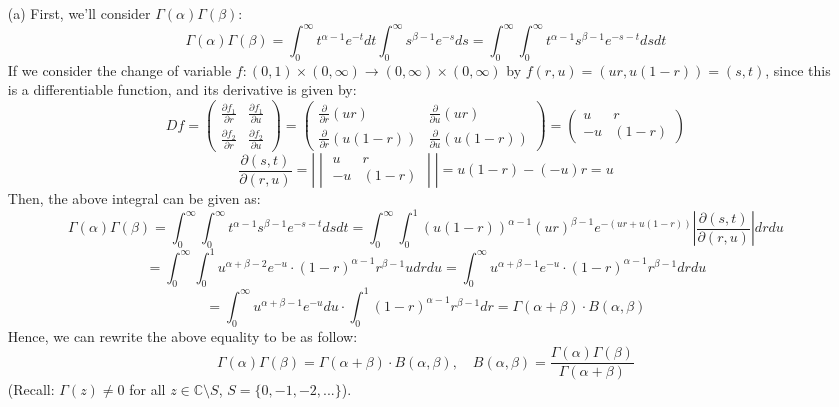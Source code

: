 \documentclass{article}
\begin{document}
\begin{itemize}
    \item[(a)] First, we'll consider $\Gamma(\alpha)\Gamma(\beta)$:
    $$\Gamma(\alpha)\Gamma(\beta)=\int_{0}^{\infty}t^{\alpha-1}e^{-t}dt\int_{0}^{\infty}s^{\beta-1}e^{-s}ds=\int_{0}^{\infty}\int_{0}^{\infty}t^{\alpha-1}s^{\beta-1}e^{-s-t}dsdt$$
    If we consider the change of variable $f:(0,1)\times (0,\infty)\rightarrow (0,\infty)\times (0,\infty)$ by $f(r,u)=(ur,u(1-r))=(s,t)$, since this is a differentiable function, and its derivative is given by:
    $$Df = \begin{pmatrix}
        \frac{\partial f_1}{\partial r}&\frac{\partial f_1}{\partial u}\\
        \frac{\partial f_2}{\partial r}&\frac{\partial f_2}{\partial u}
    \end{pmatrix}=\begin{pmatrix}
        \frac{\partial}{\partial r}(ur)&\frac{\partial}{\partial u}(ur)\\
        \frac{\partial}{\partial r}(u(1-r))&\frac{\partial}{\partial u}(u(1-r))
    \end{pmatrix}=\begin{pmatrix}
        u&r\\
        -u&(1-r) 
    \end{pmatrix}$$
    $$\frac{\partial (s,t)}{\partial (r,u)}=|\begin{vmatrix}
        u&r\\-u&(1-r)
    \end{vmatrix}|=u(1-r)-(-u)r=u$$
    Then, the above integral can be given as:
    $$\Gamma(\alpha)\Gamma(\beta)=\int_{0}^{\infty}\int_{0}^{\infty}t^{\alpha-1}s^{\beta-1}e^{-s-t}dsdt = \int_{0}^{\infty}\int_{0}^{1}(u(1-r))^{\alpha-1}(ur)^{\beta-1}e^{-(ur+u(1-r))}\left|\frac{\partial (s,t)}{\partial (r,u)}\right|drdu$$
    $$=\int_{0}^{\infty}\int_{0}^{1}u^{\alpha+\beta-2}e^{-u}\cdot (1-r)^{\alpha-1}r^{\beta-1}udrdu=\int_{0}^{\infty}u^{\alpha+\beta-1}e^{-u}\cdot (1-r)^{\alpha-1}r^{\beta-1}drdu$$
    $$=\int_{0}^{\infty}u^{\alpha+\beta-1}e^{-u}du\cdot\int_{0}^{1}(1-r)^{\alpha-1}r^{\beta-1}dr = \Gamma(\alpha+\beta)\cdot B(\alpha,\beta)$$
    Hence, we can rewrite the above equality to be as follow:
    $$\Gamma(\alpha)\Gamma(\beta)=\Gamma(\alpha+\beta)\cdot B(\alpha,\beta),\quad B(\alpha,\beta)=\frac{\Gamma(\alpha)\Gamma(\beta)}{\Gamma(\alpha+\beta)}$$
    (Recall: $\Gamma(z)\neq 0$ for all $z\in\mathbb{C}\setminus S$, $S=\{0,-1,-2,...\}$).
    
    \hfil 


\end{itemize}
\end{document}
